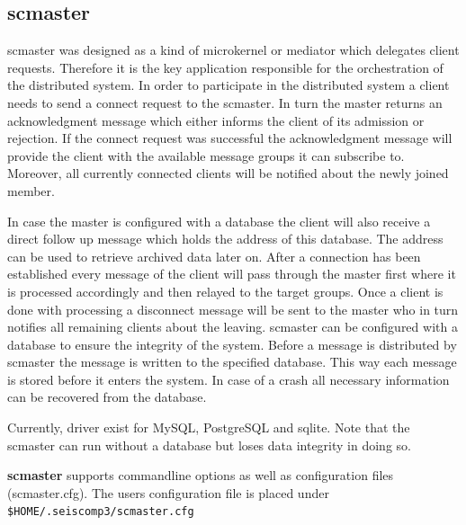 \documentclass[11pt,a4paper,titlepage]{article}
\newcommand{\cmd}[1]{\texttt{#1}}
\begin{document}
\subsection{scmaster}

scmaster was designed as a kind of microkernel or mediator which delegates client requests. Therefore it is the key application responsible for the orchestration of the distributed system. In order to participate in the distributed system a client needs to send a connect request to the scmaster. In turn the master returns an acknowledgment message which either informs the client of its admission or rejection. If the connect request was successful the acknowledgment message will provide the client with the available message groups it can subscribe to. Moreover, all currently connected clients will be notified about the newly joined member.

In case the master is configured with a database the client will also receive a direct follow up message which holds the address of this database. The address can be used to retrieve archived data later on. After a connection has been established every message of the client will pass through the master first where it is processed accordingly and then relayed to the target groups. Once a client is done with processing a disconnect message will be sent to the master who in turn notifies all remaining clients about the leaving.
scmaster can be configured with a database to ensure the integrity of the system. Before a message is distributed by scmaster the message is written to the specified database. This way each message is stored before it enters the system. In case of a crash all necessary information can be recovered from the database. 

Currently, driver exist for MySQL, PostgreSQL and sqlite. Note that the scmaster can run without a database but loses data integrity in doing so.


\textbf{scmaster} supports commandline options as well as configuration files (scmaster.cfg). The users configuration file is placed under \cmd{\$HOME/.seiscomp3/scmaster.cfg}
\end{document}

